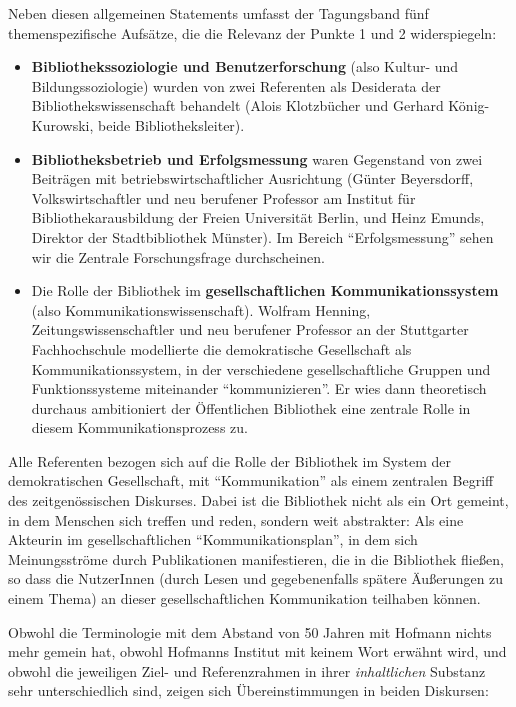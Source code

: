 \documentclass[a4paper,
fontsize=11pt,
oneside,
numbers=noperiodatend,
parskip=half-,
bibliography=totoc,
final
]{scrartcl}
\begin{document}
Neben diesen allgemeinen Statements umfasst der Tagungsband fünf
themenspezifische Aufsätze, die die Relevanz der Punkte 1 und 2
widerspiegeln:

\begin{itemize}
\item
  \textbf{Bibliothekssoziologie und Benutzerforschung} (also Kultur- und
  Bildungssoziologie) \linebreak wurden von zwei Referenten als Desiderata der
  Bibliothekswissenschaft behandelt (Alois Klotzbücher und Gerhard
  König-Kurowski, beide Bibliotheksleiter).
\item
  \textbf{Bibliotheksbetrieb und Erfolgsmessung} waren Gegenstand von
  zwei Beiträgen mit betriebswirtschaftlicher Ausrichtung (Günter
  Beyersdorff, Volkswirtschaftler und neu berufener Professor am
  Institut für Bibliothekarausbildung der Freien Universität Berlin, und
  Heinz Emunds, Direktor der Stadtbibliothek Münster). Im Bereich
  \enquote{Erfolgsmessung} sehen wir die Zentrale Forschungsfrage
  durchscheinen.
\item
  Die Rolle der Bibliothek im \textbf{gesellschaftlichen
  Kommunikationssystem} (also Kommunikationswissenschaft). Wolfram
  Henning, Zeitungswissenschaftler und neu berufener Professor an der
  Stuttgarter Fachhochschule modellierte die demokratische Gesellschaft
  als Kommunikationssystem, in der verschiedene gesellschaftliche
  Gruppen und Funktionssysteme miteinander \enquote{kommunizieren}. Er
  wies dann theoretisch durchaus ambitioniert der Öffentlichen
  Bibliothek eine zentrale Rolle in diesem Kommunikationsprozess zu.
\end{itemize}

Alle Referenten bezogen sich auf die Rolle der Bibliothek im System der
demokratischen Gesellschaft, mit \enquote{Kommunikation} als einem
zentralen Begriff des zeitgenössischen Diskurses. Dabei ist die
Bibliothek nicht als ein Ort gemeint, in dem Menschen sich treffen und
reden, sondern weit abstrakter: Als eine Akteurin im gesellschaftlichen
\enquote{Kommunikationsplan}, in dem sich Meinungsströme durch
Publikationen manifestieren, die in die Bibliothek fließen, so dass die
NutzerInnen (durch Lesen und gegebenenfalls spätere Äußerungen zu einem
Thema) an dieser gesellschaftlichen Kommunikation teilhaben können.

Obwohl die Terminologie mit dem Abstand von 50 Jahren mit Hofmann nichts
mehr gemein hat, obwohl Hofmanns Institut mit keinem Wort erwähnt wird,
und obwohl die jeweiligen Ziel- und Referenzrahmen in ihrer
\emph{inhaltlichen} Substanz sehr unterschiedlich sind, zeigen sich
Übereinstimmungen in beiden Diskursen:
\end{document}
